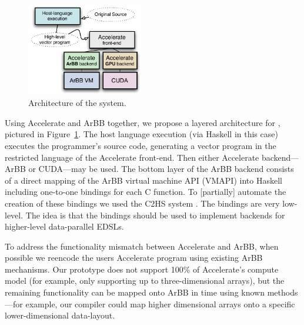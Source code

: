 
\begin{figure}
  \begin{center}
   \includegraphics[width=2.0in]{./arbb/figure_architecture}    
  \end{center}
\vspace{-5mm}
  \caption{Architecture of the \systemname{} system.  }
  \label{f:architecture}
\end{figure}


Using Accelerate and ArBB together, we propose a layered architecture
for \systemname{},
pictured in Figure~\ref{f:architecture}. 
The host language execution (via Haskell in this case) executes the
programmer's source code, generating a vector program in the
restricted language of the Accelerate front-end.
Then either Accelerate backend---ArBB or CUDA---may be used.
The 
bottom layer of the ArBB backend consists of a direct mapping of the ArBB virtual machine
API (VMAPI) into Haskell including one-to-one bindings for each C 
function. 
To [partially] automate the creation of these bindings we used the C2HS system \cite{C2HS}. The 
\arbbvmH{} bindings are very low-level.
The idea 
is that the \arbbvmH{} bindings should be used to implement
backends for higher-level data-parallel EDSLs.


To address the functionality mismatch between Accelerate and ArBB,
when possible we reencode the users Accelerate program using existing
ArBB mechanisms.  Our prototype does not support 100\% of Accelerate's
compute model (for example, only supporting  up to three-dimensional
arrays), but the remaining functionality can be mapped onto ArBB in
time using known methods---for example, our compiler could map higher
dimensional arrays onto a specific lower-dimensional data-layout.

